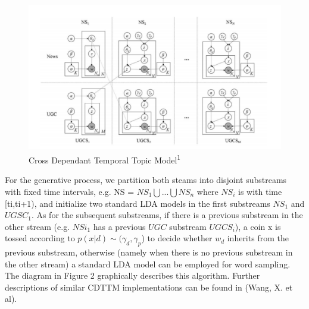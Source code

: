 \documentclass{article}
\begin{document}
\begin{figure}[H]
\centering
\includegraphics[scale=0.4]{CDTTM.png}
\caption{Cross Dependant Temporal Topic Model\textsuperscript{1}}
\end{figure}

For the generative process, we partition both steams into disjoint substreams with fixed time intervals, e.g. NS = \begin{math} NS_1  \bigcup ... \bigcup NS_n \end{math} where \begin{math} NS_i \end{math} is with time [ti,ti+1), and initialize two standard LDA models in the first substreams \begin{math} NS_1 \end{math} and \begin{math} UGSC_1 \end{math}. As for the subsequent substreams, if there is a previous substream in the other stream (e.g. \begin{math} NSi_1 \end{math} has a previous \begin{math} UGC \end{math} substream \begin{math} UGCS_i \end{math}), a coin x is tossed according to \begin{math} p(x|d) \sim (\gamma_d, \gamma_p \end{math}) to decide whether \begin{math} w_d \end{math} inherits from the previous substream, otherwise (namely when there is no previous substream in the other stream) a standard LDA model can be employed for word sampling. The diagram in Figure 2 graphically describes this algorithm. Further descriptions of similar CDTTM implementations can be found in (Wang, X. et al). 
\end{document}

